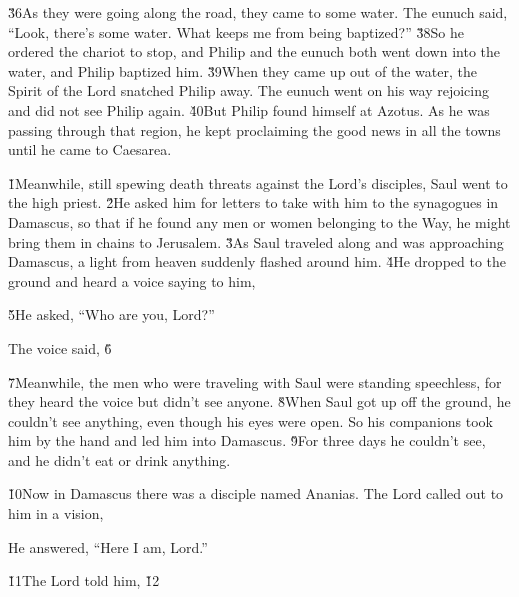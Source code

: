 \v{36}As they were going along the road, they came to some water. The eunuch said, ``Look, there's some water. What keeps me from being baptized?'' \v{38}So he ordered the chariot to stop, and Philip and the eunuch both went down into the water, and Philip baptized him. \v{39}When they came up out of the water, the Spirit of the Lord snatched Philip away. The eunuch went on his way rejoicing and did not see Philip again. \v{40}But Philip found himself at Azotus. As he was passing through that region, he kept proclaiming the good news in all the towns until he came to Caesarea.

\v{1}Meanwhile, still spewing death threats against the Lord's disciples, Saul went to the high priest. \v{2}He asked him for letters to take with him to the synagogues in Damascus, so that if he found any men or women belonging to the Way, he might bring them in chains to Jerusalem. \v{3}As Saul traveled along and was approaching Damascus, a light from heaven suddenly flashed around him. \v{4}He dropped to the ground and heard a voice saying to him, 

\v{5}He asked, ``Who are you, Lord?''

The voice said,  \v{6}

\v{7}Meanwhile, the men who were traveling with Saul were standing speechless, for they heard the voice but didn't see anyone. \v{8}When Saul got up off the ground, he couldn't see anything, even though his eyes were open. So his companions took him by the hand and led him into Damascus. \v{9}For three days he couldn't see, and he didn't eat or drink anything.

\v{10}Now in Damascus there was a disciple named Ananias. The Lord called out to him in a vision, 

He answered, ``Here I am, Lord.''

\v{11}The Lord told him,  \v{12}

